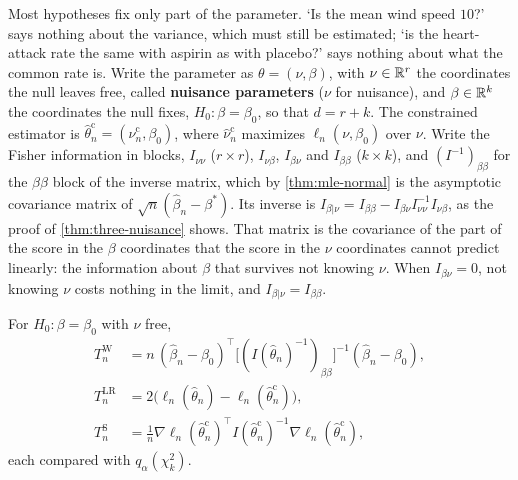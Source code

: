 Most hypotheses fix only part of the parameter.
`Is the mean wind speed $10$?' says nothing about the variance, which must still be estimated; `is the heart-attack rate the same with aspirin as with placebo?' says nothing about what the common rate is.
Write the parameter as $\theta = (\nu, \beta)$, with $\nu \in \mathbb{R}^r$ the coordinates the null leaves free, called \textbf{nuisance parameters} ($\nu$ for nuisance), and $\beta \in \mathbb{R}^k$ the coordinates the null fixes, $H_0: \beta = \beta_0$, so that $d = r + k$.
The constrained estimator is $\hat{\theta}^{\mathrm{c}}_n = (\hat{\nu}^{\mathrm{c}}_n, \beta_0)$, where $\hat{\nu}^{\mathrm{c}}_n$ maximizes $\ell_n(\nu, \beta_0)$ over $\nu$.
Write the Fisher information in blocks, $I_{\nu\nu}$ ($r \times r$), $I_{\nu\beta}$, $I_{\beta\nu}$ and $I_{\beta\beta}$ ($k \times k$), and $(I^{-1})_{\beta\beta}$ for the $\beta\beta$ block of the inverse matrix, which by \cref{thm:mle-normal} is the asymptotic covariance matrix of $\sqrt{n}(\hat{\beta}_n - \beta^*)$.
Its inverse is $I_{\beta|\nu} = I_{\beta\beta} - I_{\beta\nu}I_{\nu\nu}^{-1}I_{\nu\beta}$, as the proof of \cref{thm:three-nuisance} shows.
That matrix is the covariance of the part of the score in the $\beta$ coordinates that the score in the $\nu$ coordinates cannot predict linearly: the information about $\beta$ that survives not knowing $\nu$.
When $I_{\beta\nu} = 0$, not knowing $\nu$ costs nothing in the limit, and $I_{\beta|\nu} = I_{\beta\beta}$.

\begin{definition}
\label{def:three-nuisance}
For $H_0: \beta = \beta_0$ with $\nu$ free,
\[
\begin{aligned}
T^{\mathrm{W}}_n &= n\,(\hat{\beta}_n - \beta_0)^\top\big[(I(\hat{\theta}_n)^{-1})_{\beta\beta}\big]^{-1}(\hat{\beta}_n - \beta_0), \\
T^{\mathrm{LR}}_n &= 2\big(\ell_n(\hat{\theta}_n) - \ell_n(\hat{\theta}^{\mathrm{c}}_n)\big), \\
T^{\mathrm{S}}_n &= \tfrac1n\nabla\ell_n(\hat{\theta}^{\mathrm{c}}_n)^\top I(\hat{\theta}^{\mathrm{c}}_n)^{-1}\nabla\ell_n(\hat{\theta}^{\mathrm{c}}_n),
\end{aligned}
\]
each compared with $q_\alpha(\chi^2_k)$.
\end{definition}

